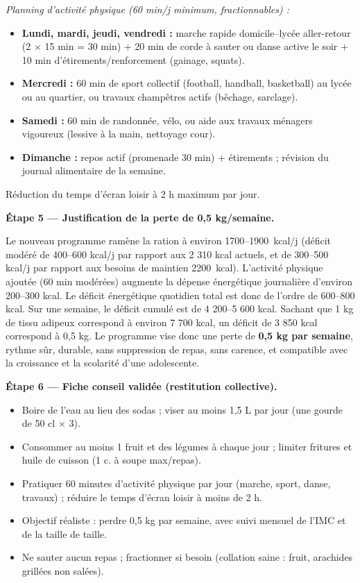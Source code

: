 \documentclass[11pt]{article}
\begin{document}
\begin{exoresolu}
\emph{Planning d'activité physique (60 min/j minimum, fractionnables) :}
\begin{itemize}
\item \textbf{Lundi, mardi, jeudi, vendredi :} marche rapide domicile--lycée aller-retour (2 $\times$ 15 min = 30 min) + 20 min de corde à sauter ou danse active le soir + 10 min d'étirements/renforcement (gainage, squats).
\item \textbf{Mercredi :} 60 min de sport collectif (football, handball, basketball) au lycée ou au quartier, ou travaux champêtres actifs (bêchage, sarclage).
\item \textbf{Samedi :} 60 min de randonnée, vélo, ou aide aux travaux ménagers vigoureux (lessive à la main, nettoyage cour).
\item \textbf{Dimanche :} repos actif (promenade 30 min) + étirements ; révision du journal alimentaire de la semaine.
\end{itemize}
Réduction du temps d'écran loisir à 2 h maximum par jour.

\textbf{Étape 5 — Justification de la perte de 0,5 kg/semaine.}

Le nouveau programme ramène la ration à environ \SI{1700}{}--\SI{1900}{kcal/j} (déficit modéré de 400--600 kcal/j par rapport aux 2 310 kcal actuels, et de 300--500 kcal/j par rapport aux besoins de maintien \SI{2200}{kcal}). L'activité physique ajoutée (60 min modérées) augmente la dépense énergétique journalière d'environ 200--300 kcal. Le déficit énergétique quotidien total est donc de l'ordre de 600--800 kcal. Sur une semaine, le déficit cumulé est de 4 200--5 600 kcal. Sachant que 1 kg de tissu adipeux correspond à environ 7 700 kcal, un déficit de 3 850 kcal correspond à 0,5 kg. Le programme vise donc une perte de \textbf{0,5 kg par semaine}, rythme sûr, durable, sans suppression de repas, sans carence, et compatible avec la croissance et la scolarité d'une adolescente.

\textbf{Étape 6 — Fiche conseil validée (restitution collective).}

\begin{itemize}
\item Boire de l'eau au lieu des sodas ; viser au moins 1,5 L par jour (une gourde de 50 cl $\times$ 3).
\item Consommer au moins 1 fruit et des légumes à chaque jour ; limiter fritures et huile de cuisson (1 c. à soupe max/repas).
\item Pratiquer 60 minutes d'activité physique par jour (marche, sport, danse, travaux) ; réduire le temps d'écran loisir à moins de 2 h.
\item Objectif réaliste : perdre 0,5 kg par semaine, avec suivi mensuel de l'IMC et de la taille de taille.
\item Ne sauter aucun repas ; fractionner si besoin (collation saine : fruit, arachides grillées non salées).
\end{itemize}
\end{exoresolu}
\end{document}

